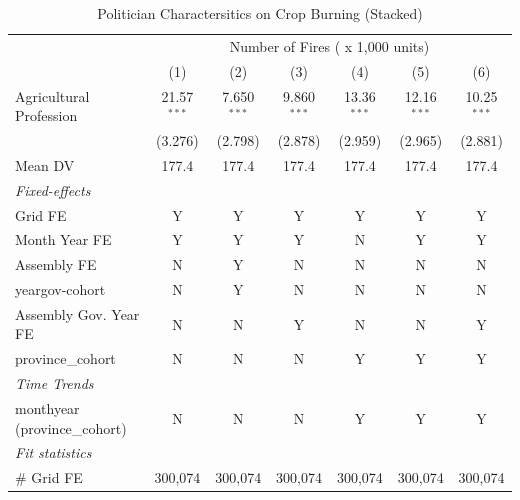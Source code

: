 
\begin{table}[htbp]
   \caption{\label{tab:ac_year_lvl} Politician Charactersitics on Crop Burning (Stacked)}
   \centering
   \begin{tabular}{lcccccc}
      \tabularnewline \midrule \midrule
       & \multicolumn{6}{c}{Number of Fires ( x 1,000 units)}\\
                                    & (1)           & (2)           & (3)           & (4)           & (5)           & (6)\\  
      \midrule 
      Agricultural Profession       & 21.57$^{***}$ & 7.650$^{***}$ & 9.860$^{***}$ & 13.36$^{***}$ & 12.16$^{***}$ & 10.25$^{***}$\\   
                                    & (3.276)       & (2.798)       & (2.878)       & (2.959)       & (2.965)       & (2.881)\\   
      \hline Mean DV                & 177.4         & 177.4         & 177.4         & 177.4         & 177.4         & 177.4\\  
      \midrule
      \emph{Fixed-effects}\\
      Grid FE                       & Y             & Y             & Y             & Y             & Y             & Y\\  
      Month Year FE                 & Y             & Y             & Y             & N             & Y             & Y\\  
      Assembly FE                   & N             & Y             & N             & N             & N             & N\\  
      yeargov-cohort                & N             & Y             & N             & N             & N             & N\\  
      Assembly Gov. Year FE         & N             & N             & Y             & N             & N             & Y\\  
      province\_cohort              & N             & N             & N             & Y             & Y             & Y\\  
      \midrule \emph{Time Trends}\\
      monthyear (province\_cohort)  & N             & N             & N             & Y             & Y             & Y\\  
      \midrule
      \emph{Fit statistics}\\
      \# Grid FE                    & 300,074       & 300,074       & 300,074       & 300,074       & 300,074       & 300,074\\  

\end{tabular}
\end{table}
